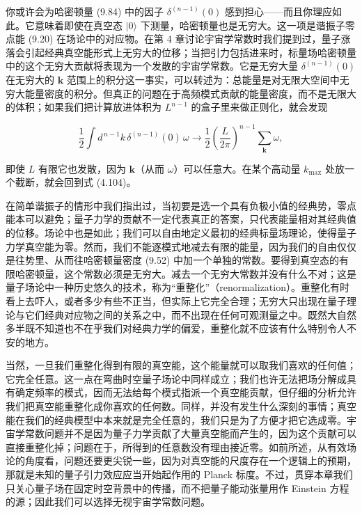 你或许会为哈密顿量 (9.84) 中的因子 $\delta^{(n-1)}(0)$ 感到担心——而且你理应如此。它意味着即使在真空态 $|0\rangle$ 下测量，哈密顿量也是无穷大。这一项是谐振子零点能 (9.20) 在场论中的对应物。在第 4 章讨论宇宙学常数时我们提到过，量子涨落会引起经典真空能形式上无穷大的位移；当把引力包括进来时，标量场哈密顿量中的这个无穷大贡献将表现为一个发散的宇宙学常数。它是无穷大量 $\delta^{(n-1)}(0)$ 在无穷大的 $\mathbf{k}$ 范围上的积分这一事实，可以转述为：总能量是对无限大空间中无穷大能量密度的积分。但真正的问题在于高频模式贡献的能量密度，而不是无限大的体积；如果我们把计算放进体积为 $L^{n-1}$ 的盒子里来做正则化，就会发现

\begin{equation*}
\frac{1}{2}\int d^{\,n-1}k\,\delta^{(n-1)}(0)\,\omega \to \frac{1}{2}\left(\frac{L}{2\pi}\right)^{n-1}\sum_{\mathbf{k}}\omega,
\tag{9.86}
\end{equation*}

即使 $L$ 有限它也发散，因为 $\mathbf{k}$（从而 $\omega$）可以任意大。在某个高动量 $k_{\mathrm{max}}$ 处放一个截断，就会回到式 (4.104)。

在简单谐振子的情形中我们指出过，当初要是选一个具有负极小值的经典势，零点能本可以避免；量子力学的贡献不一定代表真正的答案，只代表能量相对其经典值的位移。场论中也是如此；我们可以自由地定义最初的经典标量场理论，使得量子力学真空能为零。然而，我们不能逐模式地减去有限的能量，因为我们的自由仅仅是往势里、从而往哈密顿量密度 (9.52) 中加一个单独的常数。要得到真空态的有限哈密顿量，这个常数必须是无穷大。减去一个无穷大常数并没有什么不对；这是量子场论中一种历史悠久的技术，称为“重整化”（renormalization）。重整化有时看上去吓人，或者多少有些不正当，但实际上它完全合理；无穷大只出现在量子理论与它们经典对应物之间的关系之中，而不出现在任何可观测量之中。既然大自然多半既不知道也不在乎我们对经典力学的偏爱，重整化就不应该有什么特别令人不安的地方。

当然，一旦我们重整化得到有限的真空能，这个能量就可以取我们喜欢的任何值；它完全任意。这一点在弯曲时空量子场论中同样成立；我们也许无法把场分解成具有确定频率的模式，因而无法给每个模式指派一个真空能贡献，但仔细的分析允许我们把真空能重整化成你喜欢的任何数。同样，并没有发生什么深刻的事情；真空能在我们的经典模型中本来就是完全任意的，我们只是为了方便才把它选成零。宇宙学常数问题并不是因为量子力学贡献了大量真空能而产生的，因为这个贡献可以直接重整化掉；问题在于，所得到的任意数没有理由接近零。如前所述，从有效场论的角度看，问题还要更尖锐一些，因为对真空能的尺度存在一个逻辑上的预期，那就是未知的量子引力效应应当开始起作用的 Planck 标度。不过，贯穿本章我们只关心量子场在固定时空背景中的传播，而不把量子能动张量用作 Einstein 方程的源；因此我们可以选择无视宇宙学常数问题。

